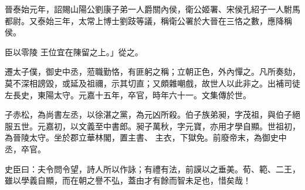 \begin{pinyinscope}
 晉泰始元年，詔賜山陽公劉康子弟一人爵關內侯，衛公姬署、宋侯孔紹子一人駙馬都尉。又泰始三年，太常上博士劉跂等議，稱衛公署於大晉在三恪之數，應降稱侯。



 臣以零陵
 王位宜在陳留之上。」從之。



 遷太子僕，御史中丞，蒞職勤恪，有匪躬之稱；立朝正色，外內憚之。凡所奏劾，莫不深相謗毀，或延及祖禰，示其切直；又頗雜嘲戲，故世人以此非之。出補司徒左長史，東陽太守。元嘉十五年，卒官，時年六十一。文集傳於世。



 子赤松，為尚書左丞，以徐湛之黨，為元凶所殺。伯子族弟昶，字茂祖，與伯子絕服五世。元嘉初，以文義至中書郎。昶子萬秋，字元寶，亦用才學自顯。世祖初，為晉陵太守。坐於郡立華林閣，置主書、
 主衣，下獄免。前廢帝末，為御史中丞，卒官。



 史臣曰：夫令問令望，詩人所以作詠；有禮有法，前謨以之垂美。荀、範、二王，雖以學義自顯，而在朝之譽不弘，蓋由才有餘而智未足也，惜矣哉！



\end{pinyinscope}